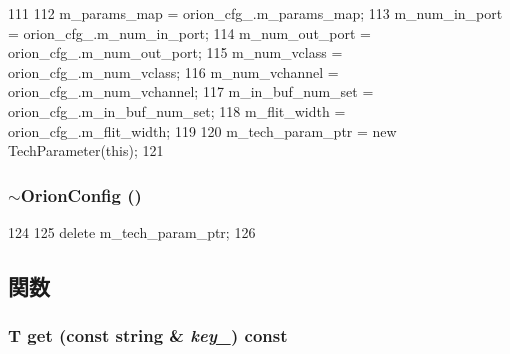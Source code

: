 \begin{DoxyCode}
111 {
112     m_params_map = orion_cfg_.m_params_map;
113     m_num_in_port = orion_cfg_.m_num_in_port;
114     m_num_out_port = orion_cfg_.m_num_out_port;
115     m_num_vclass = orion_cfg_.m_num_vclass;
116     m_num_vchannel = orion_cfg_.m_num_vchannel;
117     m_in_buf_num_set = orion_cfg_.m_in_buf_num_set;
118     m_flit_width = orion_cfg_.m_flit_width;
119 
120     m_tech_param_ptr = new TechParameter(this);
121 }
\end{DoxyCode}
\hypertarget{classOrionConfig_afb12af8e884185c2bfdb465bb789c718}{
\subsubsection[{$\sim$OrionConfig}]{\setlength{\rightskip}{0pt plus 5cm}$\sim${\bf OrionConfig} ()}}
\label{classOrionConfig_afb12af8e884185c2bfdb465bb789c718}



\begin{DoxyCode}
124 {
125     delete m_tech_param_ptr;
126 }
\end{DoxyCode}


\subsection{関数}
\hypertarget{classOrionConfig_ad4e4921359c27b857119ff2c03b6b549}{
\subsubsection[{get}]{\setlength{\rightskip}{0pt plus 5cm}T get (const string \& {\em key\_\-}) const}}
\label{classOrionConfig_ad4e4921359c27b857119ff2c03b6b549}



